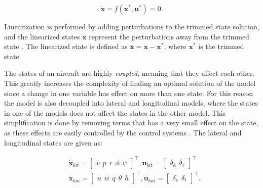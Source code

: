 \begin{equation}
	\mathbf{\dot{x}} = f(\mathbf{x}^*, \mathbf{u}^*) = 0.
\end{equation}

Linearization is performed by adding perturbations to the trimmed state solution, and the linearized states $\mathbf{\bar{x}}$ represent the perturbations away from the trimmed state \cite{modsimEGELAND}. The linearized state is defined as $\mathbf{\bar{x}} = \mathbf{x} - \mathbf{x}^*$, where $\mathbf{x}^*$ is the trimmed state.

The states of an aircraft are highly \textit{coupled}, meaning that they affect each other. This greatly increases the complexity of finding an optimal solution of the model since a change in one variable has effect on more than one state. For this reason the model is also decoupled into lateral and longitudinal models, where the states in one of the models does not affect the states in the other model. This simplification is done by removing terms that has a very small effect on the state, as these effects are easily controlled by the control systems \cite{uavBEARD}. The lateral and longitudinal states are given as:

\begin{equation}
\begin{split}
	&\mathbf{\dot{x}}_{lat} = 
	\begin{bmatrix}
		v \hspace{5pt} p \hspace{5pt} r \hspace{5pt} \phi \hspace{5pt} \psi
	\end{bmatrix} ^\intercal
	, \mathbf{u}_{lat} =
	\begin{bmatrix}
		\delta_a \hspace{5pt} \delta_r
	\end{bmatrix}^\intercal \\
	&\mathbf{\dot{x}}_{lon} =
	\begin{bmatrix}
		u \hspace{5pt} w \hspace{5pt} q \hspace{5pt} \theta \hspace{5pt} h
	\end{bmatrix}^\intercal
	, \mathbf{u}_{lon} =
	\begin{bmatrix}
		\delta_e \hspace{5pt} \delta_t
	\end{bmatrix}^\intercal.
\end{split}
\end{equation}


